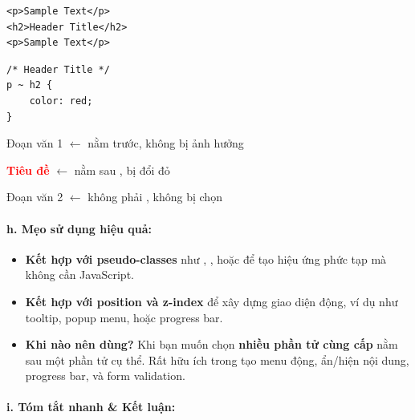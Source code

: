 \begin{codeWindow}
\begin{lstlisting}[language=HTML5]
<p>Sample Text</p>
<h2>Header Title</h2>
<p>Sample Text</p>
\end{lstlisting}

\begin{lstlisting}[language=CSS3]
/* Header Title */
p ~ h2 {
    color: red;
}
\end{lstlisting}
\end{codeWindow}

\begin{browserWindow}
\sffamily\small
\textcolor{darkText}{Đoạn văn 1} {\small\textcolor{gray!60}{$\leftarrow$ nằm trước, không bị ảnh hưởng}} \par\vspace{2pt}
\textcolor{red}{\bfseries\large Tiêu đề} {\small\textcolor{gray!60}{$\leftarrow$ nằm sau , bị đổi đỏ}} \par\vspace{2pt}
\textcolor{darkText}{Đoạn văn 2} {\small\textcolor{gray!60}{$\leftarrow$ không phải , không bị chọn}}
\end{browserWindow}

\paragraph{h. Mẹo sử dụng hiệu quả:}

\begin{tipBox}
\begin{itemize}[leftmargin=1.5em, itemsep=3pt, parsep=0pt]
    \item \textbf{Kết hợp với pseudo-classes} như , , hoặc  để tạo hiệu ứng phức tạp mà không cần JavaScript.
    \item \textbf{Kết hợp với position và z-index} để xây dựng giao diện động, ví dụ như tooltip, popup menu, hoặc progress bar.
    \item \textbf{Khi nào nên dùng?} Khi bạn muốn chọn \textbf{nhiều phần tử cùng cấp} nằm sau một phần tử cụ thể. Rất hữu ích trong tạo menu động, ẩn/hiện nội dung, progress bar, và form validation.
\end{itemize}
\end{tipBox}

\paragraph{i. Tóm tắt nhanh \& Kết luận:}

